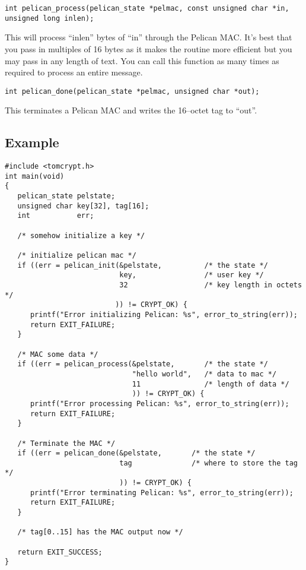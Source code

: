 \documentclass[a4paper]{book}
\begin{document}
\begin{verbatim}
int pelican_process(pelican_state *pelmac, const unsigned char *in, unsigned long inlen);
\end{verbatim}
This will process ``inlen'' bytes of ``in'' through the Pelican MAC.  It's best that you pass in multiples of 16 bytes as it makes the
routine more efficient but you may pass in any length of text.  You can call this function as many times as required to process
an entire message.

\begin{verbatim}
int pelican_done(pelican_state *pelmac, unsigned char *out);
\end{verbatim}
This terminates a Pelican MAC and writes the 16--octet tag to ``out''.

\subsection{Example}

\begin{verbatim}
#include <tomcrypt.h>
int main(void)
{
   pelican_state pelstate;
   unsigned char key[32], tag[16];
   int           err;

   /* somehow initialize a key */

   /* initialize pelican mac */
   if ((err = pelican_init(&pelstate,          /* the state */
                           key,                /* user key */
                           32                  /* key length in octets */
                          )) != CRYPT_OK) {
      printf("Error initializing Pelican: %s", error_to_string(err));
      return EXIT_FAILURE;
   }

   /* MAC some data */
   if ((err = pelican_process(&pelstate,       /* the state */
                              "hello world",   /* data to mac */        
                              11               /* length of data */
                              )) != CRYPT_OK) {
      printf("Error processing Pelican: %s", error_to_string(err));
      return EXIT_FAILURE;
   }

   /* Terminate the MAC */
   if ((err = pelican_done(&pelstate,       /* the state */
                           tag              /* where to store the tag */
                           )) != CRYPT_OK) {
      printf("Error terminating Pelican: %s", error_to_string(err));
      return EXIT_FAILURE;
   }

   /* tag[0..15] has the MAC output now */

   return EXIT_SUCCESS;
}
\end{verbatim}
\end{document}
